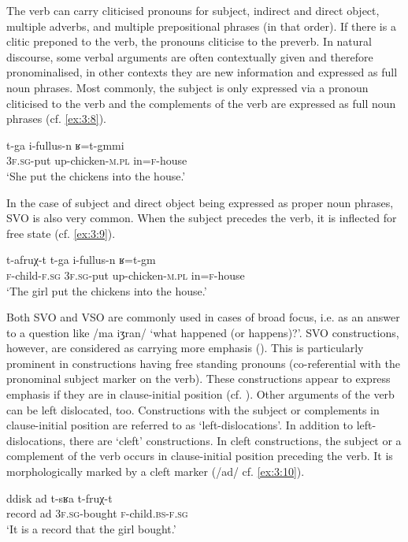 The verb can carry cliticised pronouns for subject, indirect and direct object, multiple adverbs, and multiple prepositional phrases (in that order). If there is a clitic preponed to the verb, the pronouns cliticise to the preverb. In natural discourse, some verbal arguments are often contextually given and therefore pronominalised, in other contexts they are new information and expressed as full noun phrases. Most commonly, the subject is only expressed via a pronoun cliticised to the verb and the complements of the verb are expressed as full noun phrases (cf. \ref{ex:3:8}).

\ea\label{ex:3:8} 
\gll  t-ga i-fullus-n	ʁ=t-gmmi \\
      \textsc{3f.sg}-put up-chicken-\textsc{m.pl} in=\textsc{f}-house \\
\glt ‘She put the chickens into the house.’
\z

In the case of subject and direct object being expressed as proper noun phrases, SVO is also very common. When the subject precedes the verb, it is inflected for free state (cf. \ref{ex:3:9}).

\ea\label{ex:3:9} 
\gll  t-afruχ-t t-ga i-fullus-n ʁ=t-gm \\
      \textsc{f}-child-\textsc{f.sg} \textsc{3f.sg}-put up-chicken-\textsc{m.pl} in=\textsc{f}-house\\
\glt ‘The girl put the chickens into the house.’
\z

Both SVO and VSO are commonly used in cases of broad focus, i.e. as an answer to a question like /ma iʒran/ ‘what happened (or happens)?’. SVO constructions, however, are considered as carrying more emphasis (\citealt{Sadiqi1997,MettouchiFleisch2010}). This is particularly prominent in constructions having free standing pronouns (co-referential with the pronominal subject marker on the verb). These constructions appear to express emphasis if they are in clause-initial position (cf. \citealt[221]{MettouchiFleisch2010}). Other arguments of the verb can be left dislocated, too. Constructions with the subject or complements in clause-initial position are referred to as ‘left-dislocations’. In addition to left-dislocations, there are ‘cleft’ constructions. In cleft constructions, the subject or a complement of the verb occurs in clause-initial position preceding the verb. It is morphologically marked by a cleft marker (/ad/ cf. \ref{ex:3:10}).

\ea\label{ex:3:10} 
\gll  ddisk ad t-sʁa	t-fruχ-t  \\
      record ad \textsc{3f.sg}-bought \textsc{f}-child.\textsc{bs-f.sg} \\
\glt ‘It is a record that the girl bought.’
\z

